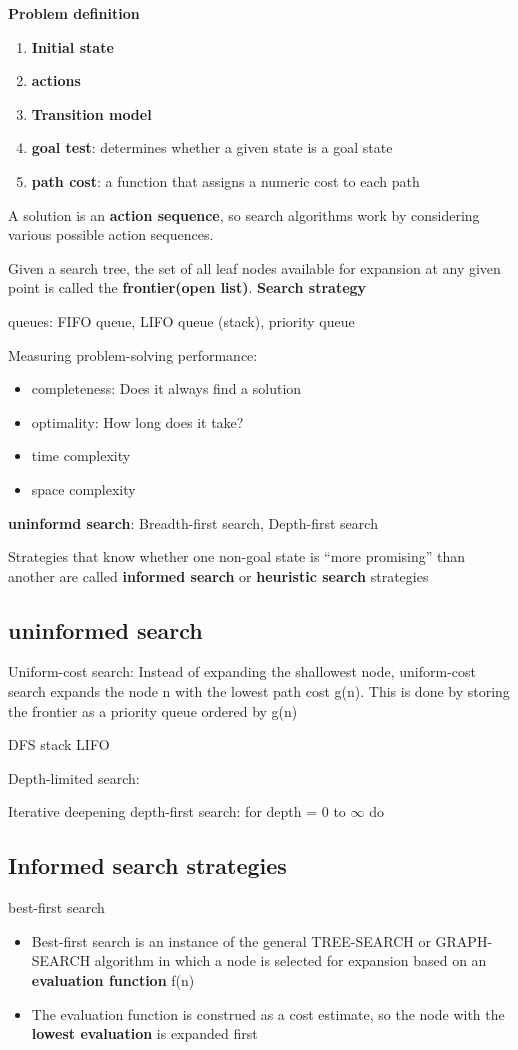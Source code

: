 \documentclass[11pt]{article}
\begin{document}
\textbf{Problem definition}
\begin{enumerate}
\item \textbf{Initial state}
\item \textbf{actions}
\item \textbf{Transition model}
\item \textbf{goal test}: determines whether a given state is a goal state
\item \textbf{path cost}: a function that assigns a numeric cost to each path
\end{enumerate}


A solution is an \textbf{action sequence}, so search algorithms work
by considering various possible action sequences.


Given a search tree, the set of all leaf nodes available for expansion at any
given point is called the \textbf{frontier(open list)}. \textbf{Search strategy}


queues: FIFO queue, LIFO queue (stack), priority queue


Measuring problem-solving performance: 
\begin{itemize}
\item completeness: Does it always find a solution
\item optimality: How long does it take?
\item time complexity
\item space complexity
\end{itemize}


\textbf{uninformd search}: Breadth-first search, Depth-first search


Strategies that know whether one non-goal state is “more promising” than
another are called \textbf{informed search} or \textbf{heuristic search} strategies

\subsection{uninformed search}
\label{sec:orgd7371f6}
Uniform-cost search: Instead of expanding the shallowest node, uniform-cost
search expands the node n with the lowest path cost g(n). This is done by
storing the frontier as a priority queue ordered by g(n)


DFS stack LIFO


Depth-limited search: 


Iterative deepening depth-first search: for depth = 0 to \(\infty\) do

\subsection{Informed search strategies}
\label{sec:orgdfcef3a}
best-first search
\begin{itemize}
\item Best-first search is an instance of the general TREE-SEARCH or GRAPH-SEARCH
algorithm in which a node is selected for expansion based on an \textbf{evaluation
function} f(n)
\item The evaluation function is construed as a cost estimate, so the node with
the \textbf{lowest evaluation} is expanded first
\end{itemize}
\end{document}
